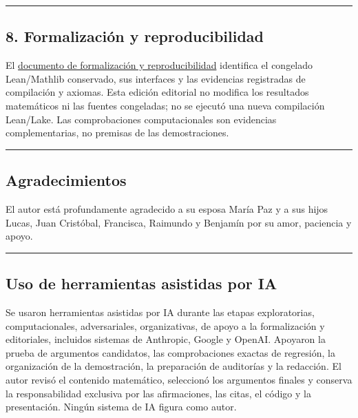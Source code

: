 \documentclass[spanish,11pt,a4paper]{article}
\begin{document}
\begin{center}\rule{0.5\linewidth}{0.5pt}\end{center}

\subsection{8. Formalización y
reproducibilidad}\label{formalizaciuxf3n-y-reproducibilidad}

El
\href{https://github.com/jtraverso/erdos-81-chordal-clique-partitions/blob/main/preprints/PAPER_II/05_formalization/FORMALIZATION_COMPANION_v1.3_es.pdf}{documento
de formalización y reproducibilidad} identifica el congelado
Lean/Mathlib conservado, sus interfaces y las evidencias registradas de
compilación y axiomas. Esta edición editorial no modifica los resultados
matemáticos ni las fuentes congeladas; no se ejecutó una nueva
compilación Lean/Lake. Las comprobaciones computacionales son evidencias
complementarias, no premisas de las demostraciones.

\begin{center}\rule{0.5\linewidth}{0.5pt}\end{center}

\subsection{Agradecimientos}\label{agradecimientos}

El autor está profundamente agradecido a su esposa María Paz y a sus
hijos Lucas, Juan Cristóbal, Francisca, Raimundo y Benjamín por su amor,
paciencia y apoyo.

\begin{center}\rule{0.5\linewidth}{0.5pt}\end{center}

\subsection{Uso de herramientas asistidas por
IA}\label{uso-de-herramientas-asistidas-por-ia}

Se usaron herramientas asistidas por IA durante las etapas
exploratorias, computacionales, adversariales, organizativas, de apoyo a
la formalización y editoriales, incluidos sistemas de Anthropic, Google
y OpenAI. Apoyaron la prueba de argumentos candidatos, las
comprobaciones exactas de regresión, la organización de la demostración,
la preparación de auditorías y la redacción. El autor revisó el
contenido matemático, seleccionó los argumentos finales y conserva la
responsabilidad exclusiva por las afirmaciones, las citas, el código y
la presentación. Ningún sistema de IA figura como autor.
\end{document}
